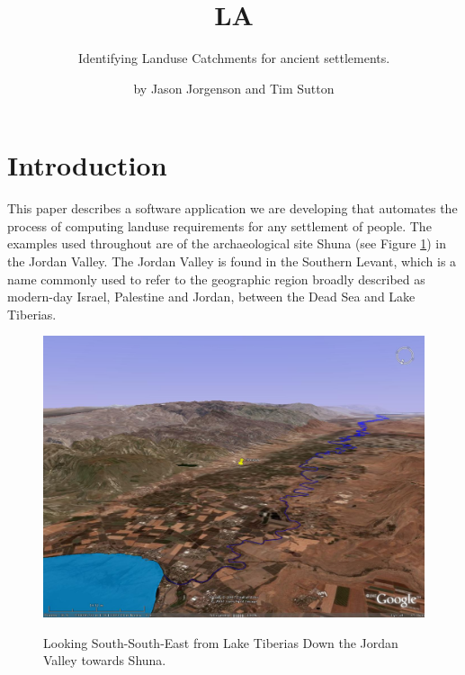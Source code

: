 

\title{LA} \subtitle{Identifying Landuse Catchments for 
ancient settlements.}

\author{by Jason Jorgenson and Tim Sutton}

\maketitle

\section{Introduction} \label{sec:Introduction}

This paper describes a software application we are developing that automates
the process of computing landuse requirements for any settlement of people.
The examples used throughout are of the archaeological site Shuna (see Figure
\ref{fig:shunaGoogleEarth}) in the Jordan Valley.
The Jordan Valley is found in the Southern Levant, which is
a name commonly used to refer to the geographic region broadly described as
modern-day Israel, Palestine and Jordan, between the Dead Sea and Lake
Tiberias.

\begin{figure}[htbp] %
\includegraphics[scale=0.17]{./images/ShunaGoogleEarth3D.jpg}
\label{fig:shunaGoogleEarth} \caption{Looking South-South-East from Lake
Tiberias Down the Jordan Valley towards Shuna.} \end{figure}

